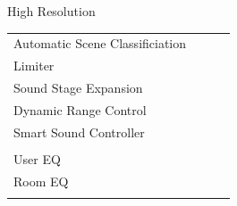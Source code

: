\documentclass{beamer}
\begin{document}
\begin{frame}[t]{High Resolution}
\begin{tiny}
\begin{tabular}{@{}lccc@{}}
				Automatic Scene Classificiation & \color{black}{Off} & & \\
				Limiter & \color{black}{Off} & & \\
				Sound Stage Expansion & \color{black}{Off} & & \\
				Dynamic Range Control & \color{black}{Off} & & \\
				Smart Sound Controller & \color{black}{Off} & & \\
				\color{blue}{High Resolution} & \color{blue}{On} & & \\
				User EQ & \color{black}{Off} & & \\
				Room EQ & \color{black}{Off} & & \\
				\color{blue}{OSD Volume} & \color{blue}{On} &  \color{blue}{Vol.40} & \\
				\midrule
			\end{tabular}
		\end{tiny}
		
	\end{frame}
	
\end{document}

